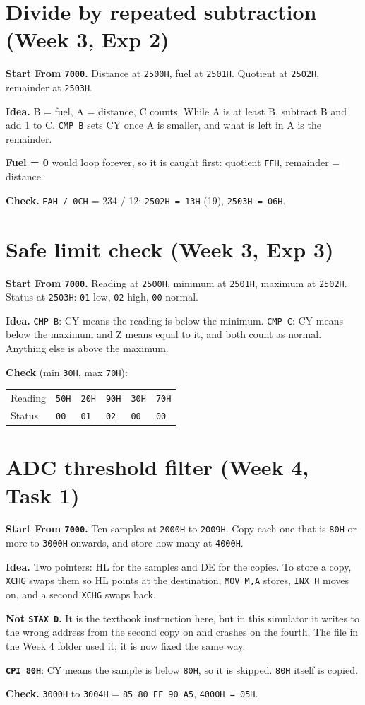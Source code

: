 \documentclass[11pt,a4paper]{article}
\newcommand{\code}[1]{\texttt{#1}}
\newcommand{\prog}[2]{\needspace{12\baselineskip}\section{#1}\label{#2}}
\newcommand{\meta}[2]{\textbf{Start From \code{#1}.} #2\par}
\newcommand{\twocol}[3]{%
\begin{minipage}[t]{#1\textwidth}\vspace{0pt}\end{minipage}\hfill
\begin{minipage}[t]{\dimexpr0.97\textwidth-#1\textwidth\relax}\vspace{0pt}#3\end{minipage}\par}
\begin{document}
\prog{Divide by repeated subtraction (Week 3, Exp 2)}{p6}
\meta{7000}{Distance at \code{2500H}, fuel at \code{2501H}. Quotient at \code{2502H}, remainder at \code{2503H}.}
\twocol{0.34}{w3_e2_div.asm}{%
\textbf{Idea.} B = fuel, A = distance, C counts. While A is at least B, subtract B and add 1 to C. \code{CMP B} sets CY once A is smaller, and what is left in A is the remainder.

\textbf{Fuel = 0} would loop forever, so it is caught first: quotient \code{FFH}, remainder = distance.

\textbf{Check.} \code{EAH / 0CH} = 234 / 12: \code{2502H = 13H} (19), \code{2503H = 06H}.}

\prog{Safe limit check (Week 3, Exp 3)}{p7}
\meta{7000}{Reading at \code{2500H}, minimum at \code{2501H}, maximum at \code{2502H}. Status at \code{2503H}: \code{01} low, \code{02} high, \code{00} normal.}
\twocol{0.34}{w3_e3_limit.asm}{%
\textbf{Idea.} \code{CMP B}: CY means the reading is below the minimum. \code{CMP C}: CY means below the maximum and Z means equal to it, and both count as normal. Anything else is above the maximum.

\textbf{Check} (min \code{30H}, max \code{70H}):

\begin{tabular}{@{}llllll@{}}
Reading & \code{50H} & \code{20H} & \code{90H} & \code{30H} & \code{70H}\\
Status & \code{00} & \code{01} & \code{02} & \code{00} & \code{00}\\
\end{tabular}}

\prog{ADC threshold filter (Week 4, Task 1)}{p8}
\meta{7000}{Ten samples at \code{2000H} to \code{2009H}. Copy each one that is \code{80H} or more to \code{3000H} onwards, and store how many at \code{4000H}.}
\twocol{0.42}{w4_t1_adc_filter.asm}{%
\textbf{Idea.} Two pointers: HL for the samples and DE for the copies. To store a copy, \code{XCHG} swaps them so HL points at the destination, \code{MOV M,A} stores, \code{INX H} moves on, and a second \code{XCHG} swaps back.

{\color{warn}\textbf{Not \code{STAX D}.}} It is the textbook instruction here, but in this simulator it writes to the wrong address from the second copy on and crashes on the fourth. The file in the Week 4 folder used it; it is now fixed the same way.

\textbf{\code{CPI 80H}}: CY means the sample is below \code{80H}, so it is skipped. \code{80H} itself is copied.

\textbf{Check.} \code{3000H} to \code{3004H} = \code{85 80 FF 90 A5}, \code{4000H = 05H}.}
\end{document}
